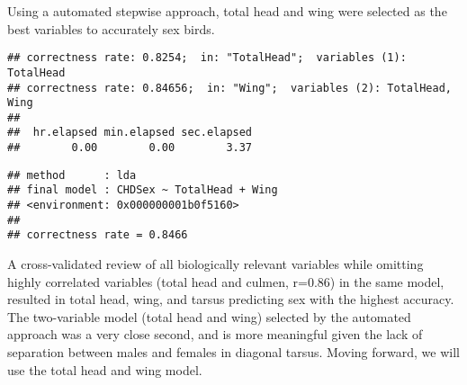 \documentclass[
]{article}
\begin{document}
Using a automated stepwise approach, total head and wing were selected
as the best variables to accurately sex birds.

\begin{verbatim}
## correctness rate: 0.8254;  in: "TotalHead";  variables (1): TotalHead 
## correctness rate: 0.84656;  in: "Wing";  variables (2): TotalHead, Wing 
## 
##  hr.elapsed min.elapsed sec.elapsed 
##        0.00        0.00        3.37
\end{verbatim}

\begin{verbatim}
## method      : lda 
## final model : CHDSex ~ TotalHead + Wing
## <environment: 0x000000001b0f5160>
## 
## correctness rate = 0.8466
\end{verbatim}

A cross-validated review of all biologically relevant variables while
omitting highly correlated variables (total head and culmen, r=0.86) in
the same model, resulted in total head, wing, and tarsus predicting sex
with the highest accuracy. The two-variable model (total head and wing)
selected by the automated approach was a very close second, and is more
meaningful given the lack of separation between males and females in
diagonal tarsus. Moving forward, we will use the total head and wing
model.
\end{document}
